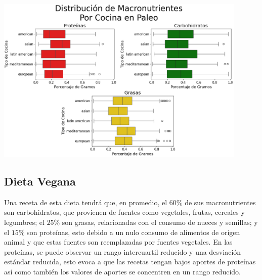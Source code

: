 \documentclass[12pt,a4paper]{article}
\begin{document}
{{            \begin{center}
                \includegraphics[width=0.9\textwidth]{Resources/EDA/Paleo_2.png}
            \end{center}
        }

        \subsection{Dieta Vegana}
        {
            Una receta de esta dieta tendrá que, en promedio, el $60\%$ de 
            sus macronutrientes son carbohidratos, que provienen de fuentes 
            como vegetales, frutas, cereales y legumbres; el $25\%$ son grasas, 
            relacionadas con el consumo de nueces y semillas; y el $15\%$ son 
            proteínas, esto debido a un nulo consumo de alimentos de origen 
            animal y que estas fuentes son reemplazadas por fuentes vegetales. 
            En las proteínas, se puede observar un rango intercuartil reducido y una 
            desviación estándar reducida, esto evoca a que las recetas tengan bajos 
            aportes de proteínas así como también los valores de aportes se concentren 
            en un rango reducido.\\

}}
\end{document}

